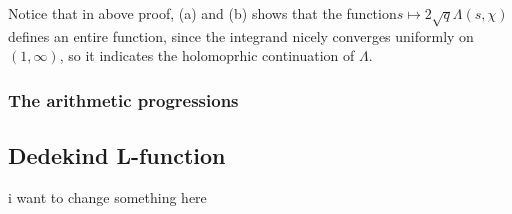 \begin{remark}
    Notice that in above proof, (a) and (b) shows that the function\(s \mapsto 2\sqrt{q}\Lambda(s,\chi)\) defines an entire function, since the integrand nicely converges uniformly on \((1,\infty)\), so it indicates the holomoprhic continuation of \(\Lambda\).
\end{remark}

\subsubsection{The arithmetic progressions}

\subsection{Dedekind L-function}

i want to change something here 


    
